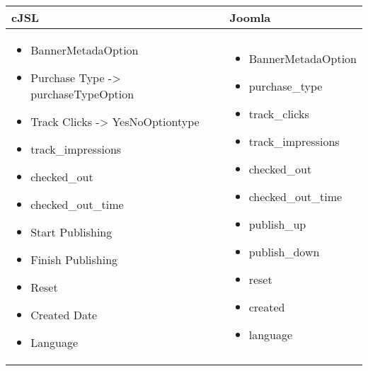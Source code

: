 \begin{minipage}{0.8\textwidth}
\begin{tabular}{|p{} | p{}|}
\hline
\textbf{cJSL} & \textbf{Joomla} \\ 
\hline
\begin{itemize}
\item BannerMetadaOption
\item  Purchase Type -> purchaseTypeOption
\item  Track Clicks -> YesNoOptiontype
\item  track\_impressions
\item  checked\_out
\item  checked\_out\_time
\item  Start Publishing
\item  Finish Publishing
\item  Reset
\item  Created Date
\item  Language
\end{itemize}
 & 
\begin{itemize}
\item BannerMetadaOption
\item  purchase\_type
\item  track\_clicks
\item  track\_impressions
\item  checked\_out
\item  checked\_out\_time
\item  publish\_up
\item  publish\_down
\item  reset
\item  created
\item  language
\end{itemize}
\\
\hline
\end{tabular}
\end{minipage}

